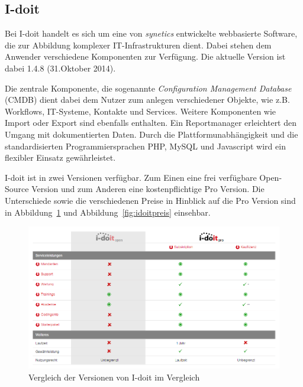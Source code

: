 
\subsection{I-doit}

Bei I-doit handelt es sich um eine von \textit{synetics} entwickelte webbasierte Software, die zur Abbildung komplexer IT-Infrastrukturen dient.
Dabei stehen dem Anwender verschiedene Komponenten zur Verfügung. 
Die aktuelle Version ist dabei 1.4.8 (31.Oktober 2014). 

Die zentrale Komponente, die sogenannte \textit{Configuration Management Database} (CMDB) dient dabei dem Nutzer zum anlegen verschiedener Objekte, wie z.B. Workflows, IT-Systeme, Kontakte und Services.
Weitere Komponenten wie Import oder Export sind ebenfalls enthalten.
Ein Reportmanager erleichtert den Umgang mit dokumentierten Daten. 
Durch die Plattformunabhängigkeit und die standardisierten Programmiersprachen PHP, MySQL und Javascript wird ein flexibler Einsatz gewährleistet.

I-doit ist in zwei Versionen verfügbar. Zum Einen eine frei verfügbare Open-Source Version und zum Anderen eine kostenpflichtige Pro Version.
Die Unterschiede sowie die verschiedenen Preise in Hinblick auf die Pro Version sind in Abbildung~\ref{fig:idoitvergleich} und Abbildung~\ref{fig:idoitpreis} einsehbar.

\begin{figure}[htbp]
\includegraphics[width=\textwidth]{images/idoitvergleich}
\caption{Vergleich der Versionen von I-doit im Vergleich}
\label{fig:idoitvergleich}
\end{figure}

